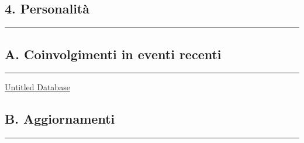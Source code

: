 \subsection{4. Personalità}\label{personalituxe0}

\begin{center}\rule{0.5\linewidth}{0.5pt}\end{center}

\subsection{A. Coinvolgimenti in eventi
recenti}\label{a.-coinvolgimenti-in-eventi-recenti}

\begin{center}\rule{0.5\linewidth}{0.5pt}\end{center}

\href{Untitled\%20Database\%2011e31a90c4de4b4e8b6da34fd12f13e9.csv}{Untitled
Database}

\subsection{B. Aggiornamenti}\label{b.-aggiornamenti}

\begin{center}\rule{0.5\linewidth}{0.5pt}\end{center}

\href{Untitled\%20f91756bc0aea4e4ab43710d40315e574.csv}{}
